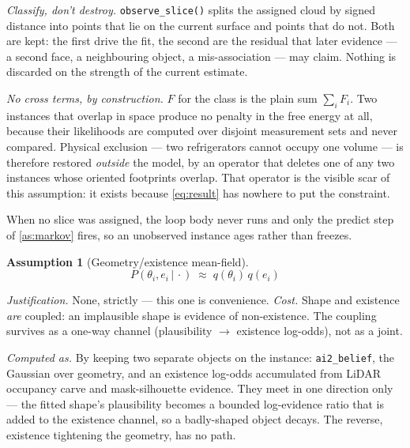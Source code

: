 \documentclass[11pt,a4paper]{report}
\newcommand{\given}{\,|\,}
\theoremstyle{definition}   %
\newtheorem{assumption}{Assumption}
\begin{document}
\emph{Classify, don't destroy.} \texttt{observe\_slice()} splits the assigned cloud by signed
distance into points that lie on the current surface and points that do not. Both are kept: the
first drive the fit, the second are the residual that later evidence --- a second face, a
neighbouring object, a mis-association --- may claim. Nothing is discarded on the strength of the
current estimate.

\emph{No cross terms, by construction.} $F$ for the class is the plain sum $\sum_i F_i$. Two
instances that overlap in space produce no penalty in the free energy at all, because their
likelihoods are computed over disjoint measurement sets and never compared. Physical exclusion ---
two refrigerators cannot occupy one volume --- is therefore restored \emph{outside} the model, by
an operator that deletes one of any two instances whose oriented footprints overlap. That operator
is the visible scar of this assumption: it exists because \eqref{eq:result} has nowhere to put the
constraint.

When no slice was assigned, the loop body never runs and only the predict step of
\ref{as:markov} fires, so an unobserved instance ages rather than freezes.

\begin{assumption}[Geometry/existence mean-field]\label{as:geomexist}
\begin{equation}
P(\theta_i,e_i\given\cdot)\;\approx\;q(\theta_i)\,q(e_i)
\end{equation}
\end{assumption}
\noindent\textit{Justification.} None, strictly — this one is convenience. \textit{Cost.} Shape
and existence \emph{are} coupled: an implausible shape is evidence of non-existence. The coupling
survives as a one-way channel (plausibility $\rightarrow$ existence log-odds), not as a joint.


\smallskip\noindent\textit{Computed as.} By keeping two separate objects on the instance: \texttt{ai2\_belief}, the Gaussian over
geometry, and an existence log-odds accumulated from LiDAR occupancy carve and mask-silhouette
evidence. They meet in one direction only --- the fitted shape's plausibility becomes a bounded
log-evidence ratio that is added to the existence channel, so a badly-shaped object decays. The
reverse, existence tightening the geometry, has no path.
\end{document}
